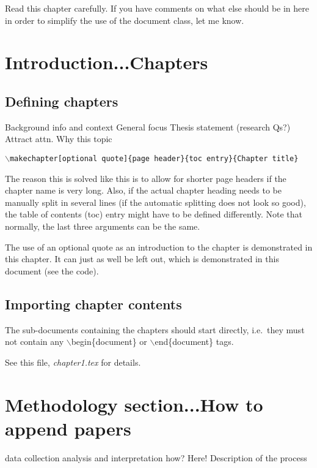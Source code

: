 Read this chapter carefully. If you have comments on what else should be in here in order to simplify the use of the document class, let me know.

\section{Introduction...Chapters}
\subsection{Defining chapters}
Background info and context
General focus
Thesis statement (research Qs?)
Attract attn.
Why this topic
\begin{center}
	\texttt{$\backslash$makechapter[optional quote]\{page header\}\{toc entry\}\{Chapter title\}}
\end{center}

The reason this is solved like this is to allow for shorter page headers if the chapter name is very long. Also, if the actual chapter heading needs to be manually split in several lines (if the automatic splitting does not look so good), the table of contents (toc) entry might have to be defined differently. Note that normally, the last three arguments can be the same. 

The use of an optional quote as an introduction to the chapter is demonstrated in this chapter. It can just as well be left out, which is demonstrated in this document (see the code).

\subsection{Importing chapter contents}
The sub-documents containing the chapters should start directly, i.e.\ they must not contain any $\backslash$begin\{document\} or $\backslash$end\{document\} tags.

See this file, \textit{chapter1.tex} for details.

\section{Methodology section...How to append papers}
data collection analysis and interpretation how? Here!
Description of the process


